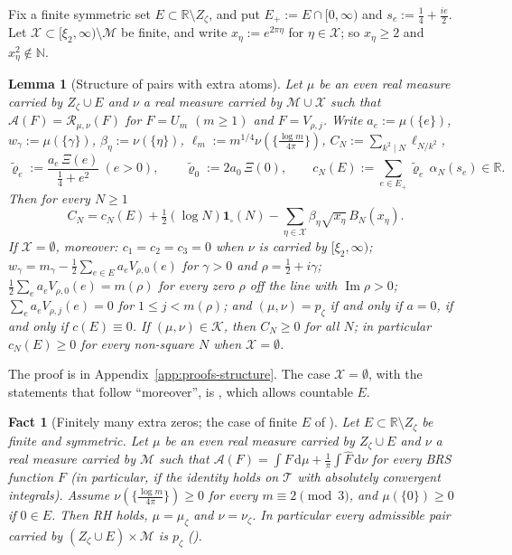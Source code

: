 \documentclass[11pt]{amsart}
\newcommand{\RR}{\mathbb R}
\newcommand{\NN}{\mathbb N}
\newcommand{\dd}{\,\mathrm d}
\renewcommand{\Im}{\operatorname{Im}}
\newcommand{\one}{\mathbf 1}
\newcommand{\hF}{\widehat F}
\newcommand{\xin}[1]{\xi_{#1}}
\newcommand{\BRS}{\mathcal M}
\newcommand{\Zz}{Z_\zeta}
\newcommand{\muz}{\mu_\zeta}
\newcommand{\nuz}{\nu_\zeta}
\newcommand{\pz}{p_\zeta}
\newcommand{\Arch}{\mathcal A}
\newcommand{\Tc}{\mathcal T}
\newcommand{\Spec}{\mathcal R}
\newcommand{\Kad}{\mathcal K}
\newtheorem{lemma}[theorem]{Lemma}
\newtheorem{fact}[theorem]{Fact}
\theoremstyle{definition}
\theoremstyle{remark}
\numberwithin{equation}{section}
\begin{document}
Fix a finite symmetric set $E\subset\RR\setminus\Zz$, and put $E_+:=E\cap[0,\infty)$ and $s_e:=\frac14+\frac{ie}2$. Let
$\mathcal X\subset[\xin2,\infty)\setminus\BRS$ be finite, and write $x_\eta:=e^{2\pi\eta}$ for $\eta\in\mathcal X$; so $x_\eta\ge2$
and $x_\eta^2\notin\NN$.

\begin{lemma}[Structure of pairs with extra atoms]\label{lem:structure}
Let $\mu$ be an even real measure carried by $\Zz\cup E$ and $\nu$ a real measure carried by $\BRS\cup\mathcal X$ such that
$\Arch(F)=\Spec_{\mu,\nu}(F)$ for $F=U_m$ $(m\ge1)$ and $F=V_{\rho,j}$. Write $a_e:=\mu(\{e\})$, $w_\gamma:=\mu(\{\gamma\})$,
$\beta_\eta:=\nu(\{\eta\})$, $\ell_m:=m^{1/4}\nu(\{\frac{\log m}{4\pi}\})$, $C_N:=\sum_{k^2\mid N}\ell_{N/k^2}$,
\[
\tilde\varrho_e:=\frac{a_e\,\Xi(e)}{\frac14+e^2}\ (e>0),\qquad \tilde\varrho_0:=2a_0\,\Xi(0),\qquad c_N(E):=\sum_{e\in E_+}\tilde\varrho_e\,\alpha_N(s_e)\in\RR .
\]
Then for every $N\ge1$
\begin{equation}\label{eq:CN}
C_N=c_N(E)+\tfrac12(\log N)\one_\square(N)-\sum_{\eta\in\mathcal X}\beta_\eta\sqrt{x_\eta}\,B_N(x_\eta).
\end{equation}
If $\mathcal X=\emptyset$, moreover: $c_1=c_2=c_3=0$ when $\nu$ is carried by $[\xin2,\infty)$; $w_\gamma=m_\gamma-\frac12\sum_{e\in E}a_eV_{\rho,0}(e)$
for $\gamma>0$ and $\rho=\frac12+i\gamma$; $\frac12\sum_ea_eV_{\rho,0}(e)=m(\rho)$ for every zero $\rho$ off the line with $\Im\rho>0$;
$\sum_ea_eV_{\rho,j}(e)=0$ for $1\le j<m(\rho)$; and $(\mu,\nu)=\pz$ if and only if $a=0$, if and only if $c(E)\equiv0$. If
$(\mu,\nu)\in\Kad$, then $C_N\ge0$ for all $N$; in particular $c_N(E)\ge0$ for every non-square $N$ when $\mathcal X=\emptyset$.
\end{lemma}

The proof is in Appendix~\ref{app:proofs-structure}. The case $\mathcal X=\emptyset$, with the statements that follow ``moreover'',
is \cite[Lemma~3.7]{PaperI}, which allows countable $E$.



\begin{fact}[Finitely many extra zeros; the case of finite $E$ of {\cite[Theorem~3.8]{PaperI}}]\label{thm:Gfin}
Let $E\subset\RR\setminus\Zz$ be finite and symmetric. Let $\mu$ be an even real measure carried by $\Zz\cup E$ and $\nu$ a real
measure carried by $\BRS$ such that $\Arch(F)=\int F\dd\mu+\frac1\pi\int\hF\dd\nu$ for every BRS function $F$ (in particular, if the
identity holds on $\Tc$ with absolutely convergent integrals). Assume $\nu(\{\frac{\log m}{4\pi}\})\ge0$ for every $m\equiv2\pmod3$, and
$\mu(\{0\})\ge0$ if $0\in E$. Then RH holds, $\mu=\muz$ and $\nu=\nuz$. In particular every admissible pair carried by
$(\Zz\cup E)\times\BRS$ is $\pz$ \textup{(}\cite[Theorem~B(b)]{PaperI}\textup{)}.
\end{fact}
\end{document}
